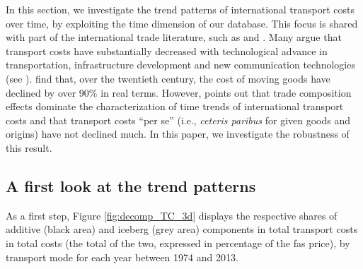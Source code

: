 \documentclass[a4paper,11pt]{article}
\begin{document}
In this section, we investigate the trend patterns of international transport costs over time, by exploiting the time dimension of our database. This focus is shared with part of the international trade literature, such as \cite{hummels2007} and \cite{Behar_Venables}. Many argue that transport costs have substantially decreased with technological advance in transportation, infrastructure development and new communication technologies (see \citealp{Lafourcade_Thisse}). \cite{Glaeser04} find that, over the twentieth century, the cost of moving goods have declined by over 90\% in real terms. However, \cite{hummels2007} points out that trade composition effects dominate the characterization of time trends of international transport costs and that transport costs ``per se'' (i.e., \textit{ceteris paribus} for given goods and origins) have not declined much. In this paper, we investigate the robustness of this result.

\subsection{A first look at the trend patterns}

As a first step, Figure \ref{fig:decomp_TC_3d} displays the respective shares of additive (black area) and iceberg (grey area) components in total transport costs in total costs (the total of the two, expressed in percentage of the fas price), by transport mode for each year between 1974 and 2013.
\end{document}
